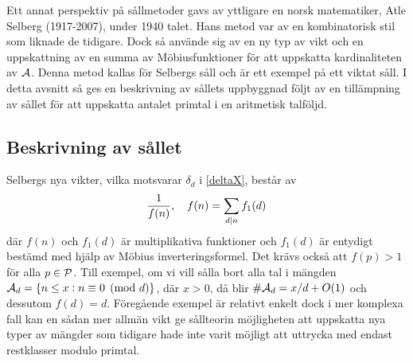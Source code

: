 Ett annat perspektiv på sållmetoder gavs av yttligare en norsk matematiker, Atle Selberg (1917-2007), under 1940 talet. 
Hans metod var av en kombinatorisk stil som liknade de tidigare.
Dock så använde sig av en ny typ av vikt och en uppskattning av en summa av Möbiusfunktioner för att uppskatta kardinaliteten av \(\A\).
Denna metod kallas för Selbergs såll och är ett exempel på ett viktat såll. I detta avsnitt så ges en beskrivning av sållets uppbyggnad följt av en tillämpning av sållet för att uppskatta antalet primtal i en aritmetisk talföljd.

\subsection{Beskrivning av sållet}
Selbergs nya vikter, vilka motsvarar \(\delta_d\) i \eqref{deltaX}, består av
\begin{equation}
    \frac{1}{f(n)},\quad f(n) = \sum_{d\divides n}f_1(d)\nonumber
\end{equation}
där \(f(n)\) och \(f_1(d)\) är multiplikativa funktioner och \(f_1(d)\) är entydigt bestämd med hjälp av Möbius inverteringsformel. Det krävs också att \(f(p) > 1\) för alla \(p\in\P\).
Till exempel, om vi vill sålla bort alla tal i mängden \(\A_d = \{n\leq x:n \equiv 0 \pmod{d}\}\), där \(x>0\), då blir \(\#\A_d = x/d + O(1)\) och dessutom \(f(d) = d\).
Föregående exempel är relativt enkelt dock i mer komplexa fall kan en sådan mer allmän vikt ge sållteorin möjligheten att uppskatta nya typer av mängder som tidigare hade inte varit möjligt att uttrycka med endast restklasser modulo primtal. 


